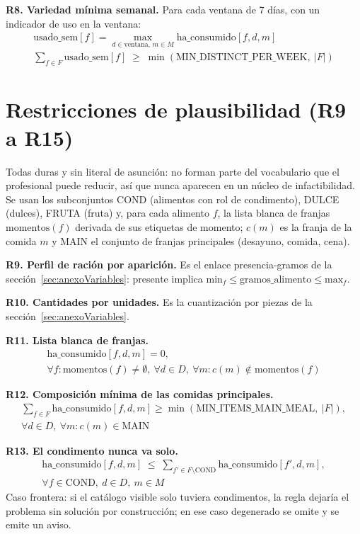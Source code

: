 \textbf{R8. Variedad mínima semanal.} Para cada ventana de 7 días, con un indicador de uso en la ventana:
\begin{gather*}
\text{usado\_sem}[f] = \max_{d \in \text{ventana},\, m \in M} \text{ha\_consumido}[f,d,m] \\
\sum_{f \in F} \text{usado\_sem}[f] \;\ge\; \min(\text{MIN\_DISTINCT\_PER\_WEEK},\ |F|)
\end{gather*}

\section{Restricciones de plausibilidad (R9 a R15)}
\label{sec:anexoPlausibilidad}

Todas duras y sin literal de asunción: no forman parte del vocabulario que el profesional puede reducir, así que nunca aparecen en un núcleo de infactibilidad. Se usan los subconjuntos COND (alimentos con rol de condimento), DULCE (dulces), FRUTA (fruta) y, para cada alimento $f$, la lista blanca de franjas $\text{momentos}(f)$ derivada de sus etiquetas de momento; $c(m)$ es la franja de la comida $m$ y MAIN el conjunto de franjas principales (desayuno, comida, cena).

\textbf{R9. Perfil de ración por aparición.} Es el enlace presencia-gramos de la sección~\ref{sec:anexoVariables}: presente implica $\text{min}_f \le \text{gramos\_alimento} \le \text{max}_f$.

\textbf{R10. Cantidades por unidades.} Es la cuantización por piezas de la sección~\ref{sec:anexoVariables}.

\textbf{R11. Lista blanca de franjas.}
\begin{gather*}
\text{ha\_consumido}[f,d,m] = 0, \\
\forall f : \text{momentos}(f) \ne \emptyset,\ \forall d \in D,\ \forall m : c(m) \notin \text{momentos}(f)
\end{gather*}

\textbf{R12. Composición mínima de las comidas principales.}
\begin{gather*}
\sum_{f \in F} \text{ha\_consumido}[f,d,m] \ge \min(\text{MIN\_ITEMS\_MAIN\_MEAL},\ |F|), \\
\forall d \in D,\ \forall m : c(m) \in \text{MAIN}
\end{gather*}

\textbf{R13. El condimento nunca va solo.}
\begin{gather*}
\text{ha\_consumido}[f,d,m] \;\le\; \sum_{f' \in F \setminus \text{COND}} \text{ha\_consumido}[f',d,m], \\
\forall f \in \text{COND},\ d \in D,\ m \in M
\end{gather*}
Caso frontera: si el catálogo visible solo tuviera condimentos, la regla dejaría el problema sin solución por construcción; en ese caso degenerado se omite y se emite un aviso.

